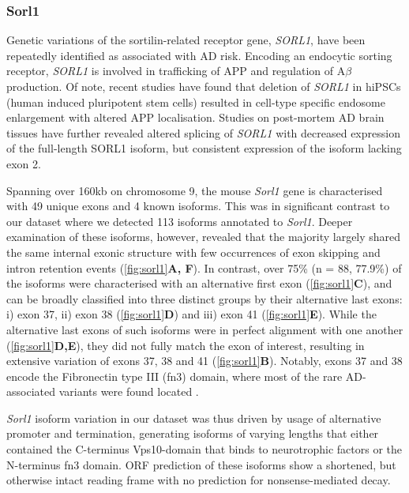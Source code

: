 \newpage
\subsubsection{Sorl1}
Genetic variations of the sortilin-related receptor gene, \textit{SORL1}, have been repeatedly identified as associated with AD risk\cite{Fernandez2016}. Encoding an endocytic sorting receptor, \textit{SORL1} is involved in trafficking of APP and regulation of A$\beta$ production\cite{Knupp2020}. Of note, recent studies have found that deletion of \textit{SORL1} in hiPSCs (human induced pluripotent stem cells) resulted in cell-type specific endosome enlargement with altered APP localisation\cite{Knupp2020}. Studies on post-mortem AD brain tissues have further revealed altered splicing of \textit{SORL1} with decreased expression of the full-length SORL1 isoform, but consistent expression of the isoform lacking exon 2\cite{Grear2009}.  

Spanning over 160kb on chromosome 9, the mouse \textit{Sorl1} gene is characterised with 49 unique exons and 4 known isoforms. This was in significant contrast to our dataset where we detected 113 isoforms annotated to \textit{Sorl1}. Deeper examination of these isoforms, however, revealed that the majority largely shared the same internal exonic structure with few occurrences of exon skipping and intron retention events (\cref{fig:sorl1}\textbf{A, F}). In contrast, over 75\% (n = 88, 77.9\%) of the isoforms were characterised with an alternative first exon (\cref{fig:sorl1}\textbf{C}), and can be broadly classified into three distinct groups by their alternative last exons: i) exon 37, ii) exon 38 (\cref{fig:sorl1}\textbf{D}) and iii) exon 41 (\cref{fig:sorl1}\textbf{E}). While the alternative last exons of such isoforms were in perfect alignment with one another (\cref{fig:sorl1}\textbf{D,E}), they did not fully match the exon of interest, resulting in extensive variation of exons 37, 38 and 41 (\cref{fig:sorl1}\textbf{B}). Notably, exons 37 and 38 encode the Fibronectin type III (fn3) domain, where most of the rare AD-associated variants were found located \cite{Verheijen2016}. 

\textit{Sorl1} isoform variation in our dataset was thus driven by usage of alternative promoter and termination, generating isoforms of varying lengths that either contained the C-terminus Vps10-domain that binds to neurotrophic factors or the N-terminus fn3 domain. ORF prediction of these isoforms show a shortened, but otherwise intact reading frame with no prediction for nonsense-mediated decay. 

